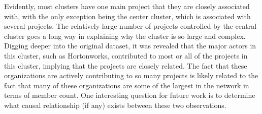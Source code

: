 Evidently, most clusters have one main project that they are closely associated with, with the only exception being the center cluster, which is associated with several projects. The relatively large number of projects controlled by the central cluster goes a long way in explaining why the cluster is so large and complex. Digging deeper into the original dataset, it was revealed that the major actors in this cluster, such as Hortonworks, contributed to most or all of the projects in this cluster, implying that the projects are closely related. The fact that these organizations are actively contributing to so many projects is likely related to the fact that many of these organizations are some of the largest in the network in terms of member count. One interesting question for future work is to determine what causal relationship (if any) exists between these two observations.